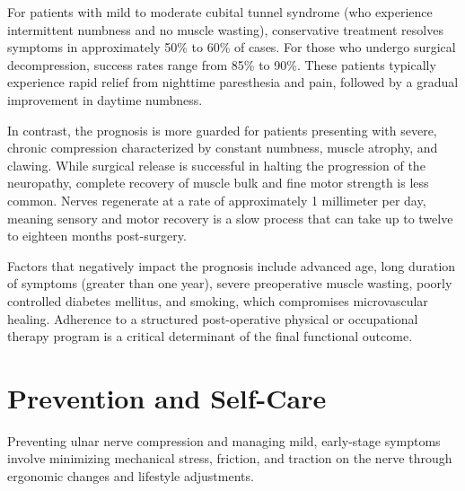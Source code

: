 For patients with mild to moderate cubital tunnel syndrome (who experience intermittent numbness and no muscle wasting), conservative treatment resolves symptoms in approximately 50\% to 60\% of cases. For those who undergo surgical decompression, success rates range from 85\% to 90\%. These patients typically experience rapid relief from nighttime paresthesia and pain, followed by a gradual improvement in daytime numbness.

In contrast, the prognosis is more guarded for patients presenting with severe, chronic compression characterized by constant numbness, muscle atrophy, and clawing. While surgical release is successful in halting the progression of the neuropathy, complete recovery of muscle bulk and fine motor strength is less common. Nerves regenerate at a rate of approximately 1 millimeter per day, meaning sensory and motor recovery is a slow process that can take up to twelve to eighteen months post-surgery.

Factors that negatively impact the prognosis include advanced age, long duration of symptoms (greater than one year), severe preoperative muscle wasting, poorly controlled diabetes mellitus, and smoking, which compromises microvascular healing. Adherence to a structured post-operative physical or occupational therapy program is a critical determinant of the final functional outcome.

\section*{Prevention and Self-Care}
Preventing ulnar nerve compression and managing mild, early-stage symptoms involve minimizing mechanical stress, friction, and traction on the nerve through ergonomic changes and lifestyle adjustments.

